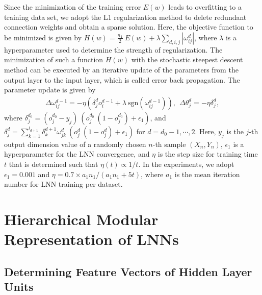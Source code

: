 \documentclass{article}
\begin{document}
Since the minimization of the training error $E(w)$ leads to overfitting to a training data set, we adopt the L1 regularization method\cite{Ishikawa1990,Tibshirani1996} to delete redundant connection weights and obtain a sparse solution. Here, the objective function to be minimized is given by $H(w) = \frac{n_1}{2}\ E(w)+\lambda \sum_{d,i,j} |\omega^d_{ij}|$, where $\lambda$ is a hyperparameter used to determine the strength of regularization. The minimization of such a function $H(w)$ with the stochastic steepest descent method can be executed by an iterative update of the parameters from the output layer to the input layer, which is called error back propagation\cite{Rumelhart1986,Werbos1974}. The parameter update is given by
\begin{eqnarray*}
\Delta \omega^{d-1}_{ij} = -\eta (\delta^d_j o^{d-1}_i+\lambda \ \mathrm{sgn}(\omega^{d-1}_{ij})),\ \ 
\Delta \theta^d_j = -\eta \delta^d_j,
\end{eqnarray*}
where $\delta^{d_0}_j = (o^{d_0}_j-y_j)\ (o^{d_0}_j\ (1-o^{d_0}_j) +\epsilon_1)$, and $\delta^d_j = \sum_{k=1}^{l_{d+1}} \delta^{d+1}_k \omega^d_{jk}\ (o^d_j\ (1-o^d_j) +\epsilon_1)$ for $d=d_0-1,\cdots, 2$. Here, $y_j$ is the $j$-th output dimension value of a randomly chosen $n$-th sample $(X_n, Y_n)$, $\epsilon_1$ is a hyperparameter for the LNN convergence, and $\eta$ is the step size for training time $t$ that is determined such that $\eta(t)\propto 1/t$. 
In the experiments, we adopt $\epsilon_1=0.001$ and $\eta =0.7\times a_1 n_1/(a_1 n_1 +5t)$, where $a_1$ is the mean iteration number for LNN training per dataset. 


\section{Hierarchical Modular Representation of LNNs}

\subsection{Determining Feature Vectors of Hidden Layer Units}
\label{sec:features}
\end{document}
